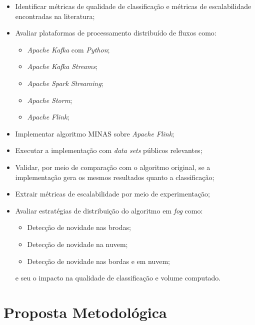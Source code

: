 \begin{itemize}
    \item Identificar métricas de qualidade de classificação e métricas de
    escalabilidade encontradas na literatura;
    \item Avaliar plataformas de processamento distribuído de fluxos como:
    \begin{itemize}
        \item \emph{Apache Kafka} com \emph{Python};
        \item \emph{Apache Kafka Streams};
        \item \emph{Apache Spark Streaming};
        \item \emph{Apache Storm};
        \item \emph{Apache Flink};
    \end{itemize}
    \item Implementar algoritmo MINAS sobre \emph{Apache Flink};
    \item Executar a implementação com \emph{data sets} públicos relevantes;
    \item Validar, por meio de comparação com o algoritmo original, se a
    implementação gera os mesmos resultados quanto a classificação;
    \item Extrair métricas de escalabilidade por meio de experimentação;
    \item Avaliar estratégias de distribuição do algoritmo em \emph{fog} como:
    \begin{itemize}
        \item Detecção de novidade nas brodas;
        \item Detecção de novidade na nuvem;
        \item Detecção de novidade nas bordas e em nuvem;
    \end{itemize}
    e seu o impacto na qualidade de classificação e volume computado.
\end{itemize}


\section{Proposta Metodológica}

